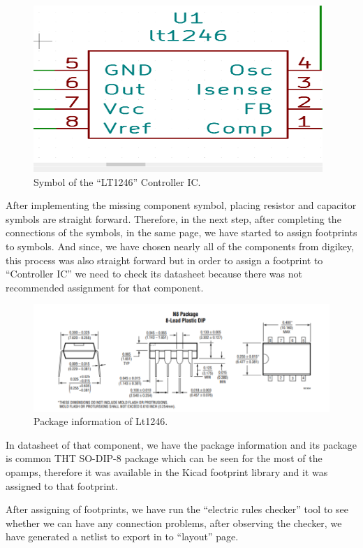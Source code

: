 \documentclass{article}
\begin{document}
\begin{figure}[H]
    \centering
    \includegraphics[scale=0.9]{PCB2.png}
    \caption{Symbol of the “LT1246” Controller IC.}
    \label{fig:my_label}
\end{figure}
After implementing the missing component symbol, placing resistor and capacitor symbols are straight forward. Therefore, in the next step, after completing the connections of the symbols, in the same page, we have started to assign footprints to symbols. And since, we have chosen nearly all of the components from digikey, this process was also straight forward but in order to assign a footprint to “Controller IC” we need to check its datasheet because there was not recommended assignment for that component.

\begin{figure}[H]
    \centering
    \includegraphics[scale=0.8]{PCB3.png}
    \caption{Package information of Lt1246.}
    \label{fig:my_label}
\end{figure}


In datasheet of that component, we have the package information and its package is common THT SO-DIP-8 package which can be seen for the most of the opamps, therefore it was available in the Kicad footprint library and it was assigned to that footprint.

After assigning of footprints, we have run the “electric rules checker” tool to see whether we can have any connection problems, after observing the checker, we have generated a netlist to export in to “layout” page.
\end{document}
